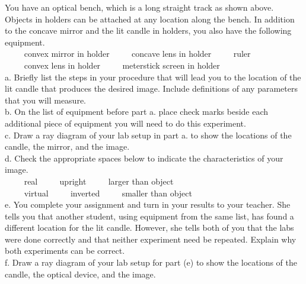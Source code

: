 \begin{enumerate}
You have an optical bench, which is a long straight track as shown above. Objects in holders can be attached at any location along the bench. In addition to the concave mirror and the lit candle in holders, you also have the following equipment.\\
$\qquad$ convex mirror in holder $\qquad$ concave lens in holder $\qquad$ ruler\\
$\qquad$ convex lens in holder $\qquad$ meterstick screen in holder\\
a. Briefly list the steps in your procedure that will lead you to the location of the lit candle that produces the desired image. Include definitions of any parameters that you will measure.\\
b. On the list of equipment before part a. place check marks beside each additional piece of equipment you will need to do this experiment.\\
c. Draw a ray diagram of your lab setup in part a. to show the locations of the candle, the mirror, and the image.\\
d. Check the appropriate spaces below to indicate the characteristics of your image.\\
$\qquad$ real $\qquad$ upright $\qquad$ larger than object\\
$\qquad$ virtual $\qquad$ inverted $\qquad$ smaller than object\\
e. You complete your assignment and turn in your results to your teacher. She tells you that another student, using equipment from the same list, has found a different location for the lit candle. However, she tells both of you that the labs were done correctly and that neither experiment need be repeated. Explain why both experiments can be correct.\\
f. Draw a ray diagram of your lab setup for part (e) to show the locations of the candle, the optical device, and the image.


\end{enumerate}
